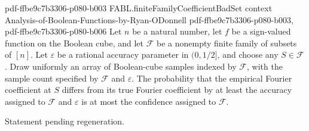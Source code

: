 \begin{theorem}
  {pdf-ffbe9c7b3306-p080-b003}
\proofstep
  {FABL.finiteFamilyCoefficientBadSet}
  {context}
  {Analysis-of-Boolean-Functions-by-Ryan-ODonnell}
  {pdf-ffbe9c7b3306-p080-b003,
    pdf-ffbe9c7b3306-p080-b006}
Let $n$ be a natural number, let $f$ be a sign-valued function on the Boolean cube, and
let $\mathcal F$ be a nonempty finite family of subsets of $[n]$. Let $\varepsilon$ be
a rational accuracy parameter in $(0,1/2]$, and choose any $S\in\mathcal F$. Draw
uniformly an array of Boolean-cube samples indexed by $\mathcal F$, with the sample
count specified by $\mathcal F$ and $\varepsilon$. The probability that the empirical
Fourier coefficient at $S$ differs from its true Fourier coefficient by at least the
accuracy assigned to $\mathcal F$ and $\varepsilon$ is at most the confidence assigned
to $\mathcal F$.
\end{theorem}

\begin{theorem}
\label{FABL.measure_finiteFamily_someCoefficient_bad_le_one_tenth}
\leanok
{}
Statement pending regeneration.
\end{theorem}

